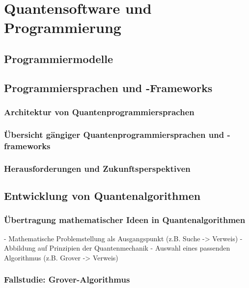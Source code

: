 \chapter{Quantensoftware und Programmierung}
\label{programming} %



\section{Programmiermodelle}

\section{Programmiersprachen und -Frameworks}
\subsection{Architektur von Quantenprogrammiersprachen}
\subsection{Übersicht gängiger Quantenprogrammiersprachen und -frameworks}
\subsection{Herausforderungen und Zukunftsperspektiven}

\section{Entwicklung von Quantenalgorithmen}

\subsection{Übertragung mathematischer Ideen in Quantenalgorithmen}

- Mathematische Problemstellung als Ausgangspunkt (z.B. Suche -> Verweis)
- Abbildung auf Prinzipien der Quantenmechanik
- Auswahl eines passenden Algorithmus (z.B. Grover -> Verweis)

\subsection{Fallstudie: Grover-Algorithmus}

